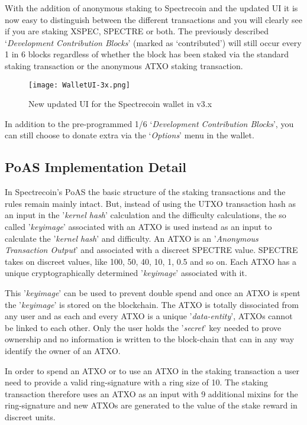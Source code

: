 With the addition of anonymous staking to Spectrecoin and the updated UI it
is now easy to distinguish between the different transactions and you will
clearly see if you are staking XSPEC, SPECTRE or both. The previously
described ‘\textit{Development Contribution Blocks}’ (marked as ‘contributed’)
will still occur every 1 in 6 blocks regardless of whether the block has
been staked via the standard staking transaction or the anonymous ATXO
staking transaction.



\begin{figure}[h]
	\caption{New updated UI for the Spectrecoin wallet in v3.x}
	\centering
	\texttt{[image: WalletUI-3x.png]}
\end{figure}



In addition to the pre-programmed 1/6 ‘\textit{Development Contribution Blocks}’,
you can still choose to donate extra via the ‘\textit{Options}’ menu in the wallet.



\subsection{PoAS Implementation Detail}
In Spectrecoin's PoAS the basic structure of the staking transactions and
the rules remain mainly intact. But, instead of using the UTXO transaction
hash as an input in the '\textit{kernel hash}' calculation and the
difficulty calculations, the so called '\textit{keyimage}' associated with
an ATXO is used instead as an input to calculate the '\textit{kernel hash}'
and difficulty. An ATXO is an '\textit{Anonymous Transaction Output}' and
associated with a discreet SPECTRE value. SPECTRE takes on discreet values,
like 100, 50, 40, 10, 1, 0.5 and so on. Each ATXO has a unique
cryptographically determined '\textit{keyimage}' associated with it.



This '\textit{keyimage}' can be used to prevent double spend and once an
ATXO is spent the '\textit{keyimage}' is stored on the blockchain. The ATXO
is totally dissociated from any user and as each and every ATXO is a unique
'\textit{data-entity}', ATXOs cannot be linked to each other. Only the user
holds the '\textit{secret}' key needed to prove ownership and no information
is written to the block-chain that can in any way identify the owner of an
ATXO.



In order to spend an ATXO or to use an ATXO in the staking transaction a user
need to provide a valid ring-signature with a ring size of 10. The staking
transaction therefore uses an ATXO as an input with 9 additional mixins for
the ring-signature and new ATXOs are generated to the value of the stake
reward in discreet units.



